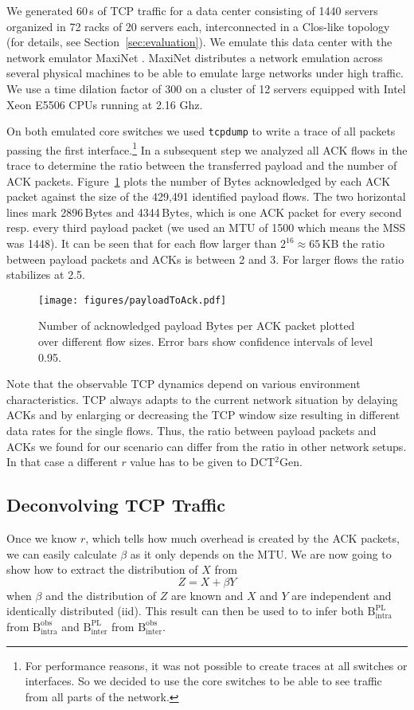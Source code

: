 \documentclass[journal,10pt]{IEEEtran}
\newcommand{\genname}{DCT${^2}$Gen}
\newcommand{\bytes}[2]{\ensuremath{\mathrm{B}^{\mathrm{#1}}_{\mathrm{#2}}}}
\begin{document}
	
	We generated 60\,s of TCP traffic for a data center
	consisting of 1440 servers organized in 72 racks of 20 servers each, interconnected in a Clos-like topology (for details, see Section~\ref{sec:evaluation}).
	We emulate this data center with the network emulator MaxiNet \cite{wette14b}.
    \mbox{MaxiNet} distributes a network emulation across several physical machines
	to be able to emulate large networks under high traffic. We use a time dilation factor of 300 
	on a cluster of 12 servers equipped with Intel Xeon E5506 CPUs running at 2.16 Ghz.
	

	
	On both emulated core switches we used \texttt{tcpdump} to write a trace of all packets passing the first interface.\footnote{For performance reasons, it was not possible to create traces at all switches or interfaces. So we decided to use the core switches to be able to see traffic from all parts of the network.}
	In a subsequent step we analyzed all ACK flows in the trace to determine the ratio between the transferred payload and the number of ACK packets.
	Figure~\ref{fig:payloadToAck} plots the number of Bytes acknowledged by each ACK packet against the size of the 429,491 identified payload flows.
	The two horizontal lines mark 2896\,Bytes and 4344\,Bytes, which is one ACK packet for every second resp. every third payload packet (we used an MTU of 1500 which means the MSS was 1448).
	It can be seen that for each flow larger than $2^{16} \approx 65$\,KB the ratio between payload packets and ACKs is between 2 and 3. For larger flows
	the ratio stabilizes at 2.5.
	
\begin{figure}
	\centering
	\texttt{[image: figures/payloadToAck.pdf]}
	\caption{Number of acknowledged payload Bytes per ACK packet plotted over different flow sizes. Error bars show confidence intervals of level 0.95.}
	\label{fig:payloadToAck}
\end{figure}
	
	Note that the observable TCP dynamics depend on various environment characteristics.
	TCP always adapts to the current network situation by delaying ACKs and by enlarging or decreasing the TCP window size resulting in different data rates
	for the single flows.
Thus, the ratio between payload packets and ACKs we found for our scenario can differ from the ratio in other network setups.
	In that case a different $r$ value has to be given to \genname{}.
	


\subsection{Deconvolving TCP Traffic}
	Once we know $r$, which tells how much overhead is created by the ACK packets, we can easily calculate $\beta$ as it only depends on the MTU.
	We are now going to show how to extract the distribution of $X$ from
	\[Z = X + \beta Y\]
	when $\beta$ and the distribution of $Z$ are known and $X$ and $Y$ are independent and identically distributed (iid).
	This result can then be used to to infer both
	\bytes{PL}{intra} from \bytes{obs}{intra} 
	and
	\bytes{PL}{inter} from \bytes{obs}{inter}.
	
\end{document}
